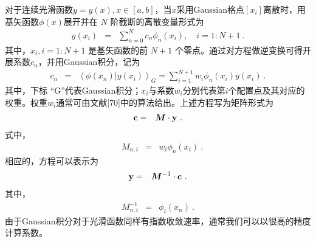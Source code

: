 \begin{theorem} \label{定理-伪谱法}
    对于连续光滑函数$y=y(x), x \in [a,b]$，当$x$采用Gaussian格点$[{x_i}]$离散时，用基矢函数$\phi (x)$展开并在 $N$ 阶截断的离散变量形式为
    \begin{eqnarray}
      y(x_i)  & = &  \sum_{n=0}^{N}  c_n \phi_n (x_i), \quad i = 1:N+1 ~. \label{ycnxi}
    \end{eqnarray}
    其中，${x_i }, i = 1:N+1$ 是基矢函数的前 $N+1$  个零点。通过对方程做逆变换可得开展系数$c_n$，并用Gaussian积分，记为
    \begin{eqnarray}
      c_n  & = &  \left <\phi(x_n) | y(x_i) \right > _G = \sum_{i=1}^{N+1} w_i \phi_n (x_i) y(x_i) ~. \label{cnyG}
    \end{eqnarray}
    其中，下标 “G”代表Gaussian积分；$x_i$与系数$w_i$分别代表第$i$个配置点及其对应的权重。权重$w_i$通常可由文献[70]中的算法给出。上述方程写为矩阵形式为
    \begin{eqnarray}
      \mathbf{c} & = & \boldsymbol{M} \cdot \mathbf{y}  ~. \label{bfc}
    \end{eqnarray}
    式中，
    \begin{eqnarray}
      \quad M_{n,i} & = & w_i \phi_n (x_i)  ~. \label{Mni}
    \end{eqnarray}
    相应的，方程可以表示为
    \begin{eqnarray}
      \mathbf{y} & = & \boldsymbol{M}^{-1} \cdot \mathbf{c} ~. \label{y}
    \end{eqnarray}
    其中，
    \begin{eqnarray}
      M_{n,i}^{-1} & = & \phi_i (x_n) ~. \label{Mniinv}
    \end{eqnarray}
    由于Gaussian积分对于光滑函数同样有指数收敛速率，通常我们可以以很高的精度计算系数。
\end{theorem}
\noindent



